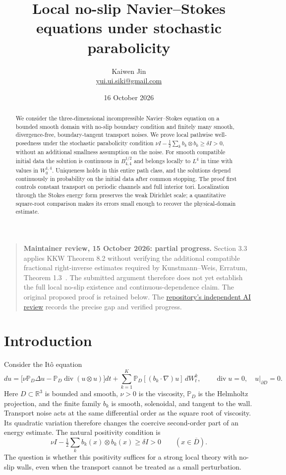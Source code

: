 \documentclass[11pt]{article}
\title{Local no-slip Navier--Stokes equations under stochastic parabolicity}
\author{Kaiwen Jin\\\small\href{mailto:yui.ui.siki@gmail.com}{yui.ui.siki@gmail.com}}
\date{16 October 2026}
\numberwithin{equation}{section}
\theoremstyle{remark}
\newcommand{\R}{\mathbb R}
\newcommand{\PP}{\mathbb P}
\newcommand{\divg}{\operatorname{div}}
\begin{document}
\maketitle

\begin{quote}\small
\textbf{Maintainer review, 15 October 2026: partial progress.}
Section 3.3 applies KKW Theorem 8.2 without verifying the additional
compatible fractional right-inverse estimates required by
Kunstmann--Weis, Erratum, Theorem 1.3~\cite{KWErratum}.
The submitted argument therefore does not yet establish the full local
no-slip existence and continuous-dependence claim. The original proposed
proof is retained below. The
\href{https://github.com/MColbrook/AIM/blob/main/research/solution_reviews/2026-10-15-active-prs/458-review.md}{repository's independent AI review}
records the precise gap and verified progress.
\end{quote}

\begin{abstract}
We consider the three-dimensional incompressible Navier--Stokes equation
on a bounded smooth domain with no-slip boundary condition and finitely
many smooth, divergence-free, boundary-tangent transport noises. We prove
local pathwise well-posedness under the stochastic parabolicity condition
$\nu I-\frac12\sum_k b_k\otimes b_k\geq\delta I>0$, without an
additional smallness assumption on the noise. For smooth compatible
initial data the solution is continuous in $B^{1/2}_{4,4}$ and belongs
locally to $L^4$ in time with values in $W^{1,4}_0$. Uniqueness holds
in this entire path class, and the solutions depend continuously in
probability on the initial data after common stopping. The proof first
controls constant transport on periodic channels and full interior
tori. Localization through the Stokes energy form preserves the weak
Dirichlet scale; a quantitative square-root comparison makes its errors
small enough to recover the physical-domain estimate.
\end{abstract}

\section{Introduction}\label{sec:intro}

Consider the It\^o equation
\begin{equation}\label{eq:NS}
 du=\bigl[\nu\PP_D\Delta u-\PP_D\divg(u\otimes u)\bigr]dt
 +\sum_{k=1}^K\PP_D[(b_k\cdot\nabla)u]\,dW^k_t,
 \qquad \divg u=0,\quad u|_{\partial D}=0.
\end{equation}
Here $D\subset\R^3$ is bounded and smooth, $\nu>0$ is the viscosity,
$\PP_D$ is the Helmholtz projection, and the finite family $b_k$ is
smooth, solenoidal, and tangent to the wall. Transport noise acts at
the same differential order as the square root of viscosity. Its
quadratic variation therefore changes the coercive second-order part
of an energy estimate. The natural positivity condition is
\[
 \nu I-\tfrac12\sum_kb_k(x)\otimes b_k(x)\geq\delta I>0
 \qquad(x\in\overline D).
\]
The question is whether this positivity suffices for a strong local
theory with no-slip walls, even when the transport cannot be treated
as a small perturbation.
\end{document}
